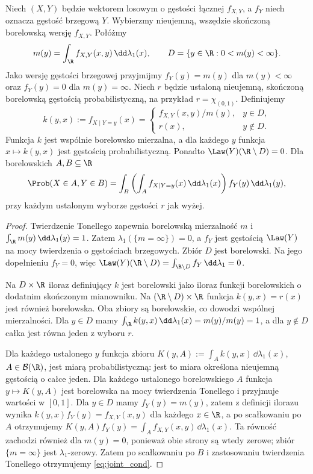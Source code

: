 \begin{stwierdzenie}
Niech $(X,Y)$ będzie wektorem losowym o gęstości łącznej $f_{X,Y}$,
a $f_Y$ niech oznacza gęstość brzegową $Y$.
Wybierzmy nieujemną, wszędzie skończoną borelowską wersję
$f_{X,Y}$. Połóżmy
\[
m(y)=\int_\R f_{X,Y}(x,y)\,\dd\lambda_1(x),\qquad
D=\{y\in\R:0<m(y)<\infty\}.
\]
Jako wersję gęstości brzegowej przyjmijmy $f_Y(y)=m(y)$
dla $m(y)<\infty$ oraz $f_Y(y)=0$ dla $m(y)=\infty$.
Niech $r$ będzie ustaloną nieujemną, skończoną borelowską
gęstością probabilistyczną, na przykład $r=\chi_{(0,1)}$.
Definiujemy
\[
k(y,x):=f_{X\mid Y=y}(x)=
\begin{cases}
f_{X,Y}(x,y)/m(y),& y\in D,\\
r(x),& y\notin D.
\end{cases}
\]
Funkcja $k$ jest wspólnie borelowsko mierzalna, a dla każdego
$y$ funkcja $x\mapsto k(y,x)$ jest gęstością probabilistyczną.
Ponadto $\Law(Y)(\R\setminus D)=0$.
Dla borelowskich $A,B\subseteq\R$
\begin{equation}\label{eq:joint_cond}
\Prob(X\in A,Y\in B)
=\int_B\left(\int_A f_{X\mid Y=y}(x)\,\dd\lambda_1(x)\right)
 f_Y(y)\,\dd\lambda_1(y),
\end{equation}
przy każdym ustalonym wyborze gęstości $r$ jak wyżej.
\end{stwierdzenie}
\begin{proof}
Twierdzenie Tonellego zapewnia borelowską mierzalność $m$ i
$\int_\R m(y)\,\dd\lambda_1(y)=1$. Zatem
$\lambda_1(\{m=\infty\})=0$, a $f_Y$ jest gęstością
$\Law(Y)$ na mocy twierdzenia o gęstościach brzegowych.
Zbiór $D$ jest borelowski. Na jego dopełnieniu $f_Y=0$,
więc $\Law(Y)(\R\setminus D)=\int_{\R\setminus D}f_Y\,\dd\lambda_1=0$.

Na $D\times\R$ iloraz definiujący $k$ jest borelowski
jako iloraz funkcji borelowskich o dodatnim skończonym
mianowniku. Na $(\R\setminus D)\times\R$ funkcja $k(y,x)=r(x)$
jest również borelowska. Oba zbiory są borelowskie, co
dowodzi wspólnej mierzalności. Dla $y\in D$ mamy
$\int_\R k(y,x)\,\dd\lambda_1(x)=m(y)/m(y)=1$,
a dla $y\notin D$ całka jest równa jeden z wyboru $r$.

Dla każdego ustalonego $y$ funkcja zbioru
$K(y,A):=\int_A k(y,x)\,\dd\lambda_1(x)$,
$A\in\mathcal B(\R)$, jest miarą probabilistyczną:
jest to miara określona nieujemną gęstością o całce jeden.
Dla każdego ustalonego borelowskiego $A$ funkcja
$y\mapsto K(y,A)$ jest borelowska na mocy twierdzenia
Tonellego i przyjmuje wartości w $[0,1]$.
Dla $y\in D$ mamy $f_Y(y)=m(y)$, zatem z definicji ilorazu wynika
$k(y,x)f_Y(y)=f_{X,Y}(x,y)$ dla każdego $x\in\R$,
a po scałkowaniu po $A$ otrzymujemy
$K(y,A)f_Y(y)=\int_A f_{X,Y}(x,y)\,\dd\lambda_1(x)$.
Ta równość zachodzi również dla $m(y)=0$, ponieważ obie
strony są wtedy zerowe; zbiór $\{m=\infty\}$ jest
$\lambda_1$-zerowy. Zatem po scałkowaniu po $B$ i zastosowaniu
twierdzenia Tonellego otrzymujemy \eqref{eq:joint_cond}.
\end{proof}

